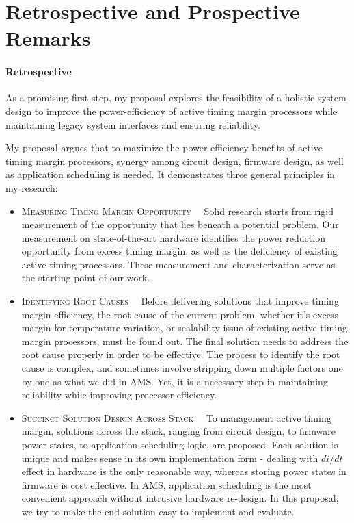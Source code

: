 
\section{Retrospective and Prospective Remarks}
\label{sec:conc}

\paragraph{Retrospective} As a promising first step, my proposal explores the feasibility of a holistic system design to improve the power-efficiency of active timing margin processors while maintaining legacy system interfaces and ensuring reliability. 

My proposal argues that to maximize the power efficiency benefits of active timing margin processors, synergy among circuit design, firmware design, as well as application scheduling is needed. It demonstrates three general principles in my research:

\begin{itemize}
  \item \textsc{Measuring Timing Margin Opportunity~~} Solid research starts from rigid measurement of the opportunity that lies beneath a potential problem. Our measurement on state-of-the-art hardware identifies the power reduction opportunity from excess timing margin, as well as the deficiency of existing active timing processors. These measurement and characterization serve as the starting point of our work.
    
  \item \textsc{Identifying Root Causes~~} Before delivering solutions that improve timing margin efficiency, the root cause of the current problem, whether it's excess margin for temperature variation, or scalability issue of existing active timing margin processors, must be found out. The final solution needs to address the root cause properly in order to be effective. The process to identify the root cause is complex, and sometimes involve stripping down multiple factors one by one as what we did in AMS. Yet, it is a necessary step in maintaining reliability while improving processor efficiency.
    
  \item \textsc{Succinct Solution Design Across Stack~~} To management active timing margin, solutions across the stack, ranging from circuit design, to firmware power states, to application scheduling logic, are proposed. Each solution is unique and makes sense in its own implementation form - dealing with $di/dt$ effect in hardware is the only reasonable way, whereas storing power states in firmware is cost effective. In AMS, application scheduling is the most convenient approach without intrusive hardware re-design. In this proposal, we try to make the end solution easy to implement and evaluate.
  
\end{itemize}

